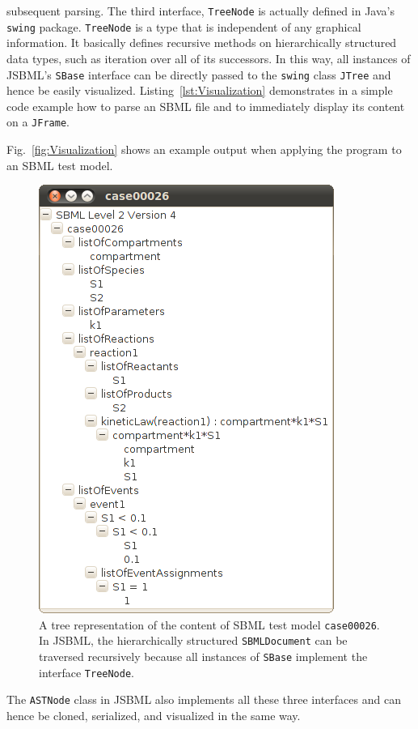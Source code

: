 \documentclass[
  BCOR12mm,
  letterpaper,
  11pt,
  headsepline,
  pointlessnumbers,
  tablecaptionabove,
  onelinecaption,
  headinclude,
  appendixprefix,
  idxtotoc,
  bibtotoc,
  twoside,
  titlepage
]{scrartcl}
\begin{document}
subsequent parsing. The third interface, \texttt{TreeNode} is actually defined
in Java's \texttt{swing} package.
\texttt{TreeNode} is a type that is independent of any graphical information. It basically defines recursive methods on hierarchically structured data types, such as iteration
over all of its successors. In this way, all instances of
JSBML's \texttt{SBase} interface can be directly passed to
the \texttt{swing} class
\texttt{JTree} and hence be
easily visualized.
Listing~\vref{lst:Visualization} demonstrates in a simple code example how to
parse an SBML file and to immediately display its content
on a \texttt{JFrame}.

Fig.~\vref{fig:Visualization} shows an example output when applying the program
to an SBML test model.
\begin{figure}
\includegraphics[width=.35\textwidth]{posters/2010_ICSB_and_COMBINE/JSBMLvisualizerTransparent}
\caption[Tree representation of an SBML file]{A tree representation of the
content of SBML test model \texttt{case00026}. In JSBML, the hierarchically
structured \texttt{SBMLDocument} can be traversed recursively because all
instances of \texttt{SBase} implement the interface \texttt{TreeNode}.}
\label{fig:Visualization}
\end{figure}
The \texttt{ASTNode} class in JSBML also implements all these three interfaces and
can hence be cloned, serialized, and visualized in the same way.
\end{document}
